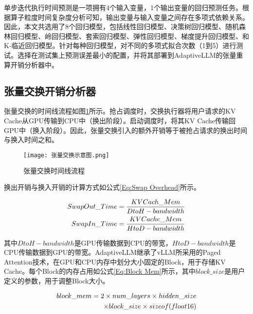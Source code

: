 单步迭代执行时间预测是一项拥有4个输入变量，1个输出变量的回归预测任务。根据算子粒度时间复杂度分析可知，输出变量与输入变量之间存在多项式依赖关系。因此，本文共选用了8个回归模型，包括线性回归模型、决策树回归模型、随机森林回归模型、岭回归模型、套索回归模型、弹性回归模型、梯度提升回归模型、和K-临近回归模型。针对每种回归模型，对不同的多项式拟合次数（1到5）进行测试。选择在测试集上预测误差最小的配置，并将其部署到AdaptiveLLM的张量重算开销分析器中。 

\subsection{张量交换开销分析器}

张量交换的时间线流程如图\ref{Fig:张量交换示意图}所示。抢占调度时，交换执行器将用户请求的KV Cache从GPU传输到CPU中（换出阶段）。启动调度时，将其KV Cache传输回GPU中（换入阶段）。因此，张量交换引入的额外开销等于被抢占请求的换出时间与换入时间之和。

\begin{figure}[!htbp]
  \centering
  \texttt{[image: 张量交换示意图.png]}
  \caption{张量交换时间线流程}
  \label{Fig:张量交换示意图}
\end{figure}

换出开销与换入开销的计算方式如公式\ref{Eq:Swap Overhead}所示。

\begin{equation}
  \begin{aligned}
    SwapOut\_Time=\frac{KVCach\_Mem}{DtoH-bandwidth} \\
    SwapIn\_Time=\frac{KVCache\_Mem}{HtoD-bandwidth}
  \end{aligned}
  \label{Eq:Swap Overhead}
  \setlength{\abovedisplayskip}{0ex}
  \setlength{\belowdisplayskip}{2ex}
\end{equation}

其中$DtoH-bandwidth$是GPU传输数据到CPU的带宽，$HtoD-bandwidth$是CPU传输数据到GPU的带宽。AdaptiveLLM继承了vLLM所采用的Paged Attention技术，在GPU和CPU内存中划分大小固定的Block，用于存储KV Cache。每个Block的内存占用如公式\ref{Eq:Block Mem}所示，其中$block\_size$是用户定义的参数，用于调整Block大小。

\begin{equation}
  \begin{aligned}
    block\_mem = 2 \times num\_layers \times hidden\_size \\ 
    \times block\_size \times sizeof(float16)
  \end{aligned}
  \label{Eq:Block Mem}
  \setlength{\abovedisplayskip}{0ex}
  \setlength{\belowdisplayskip}{2ex}
\end{equation}

